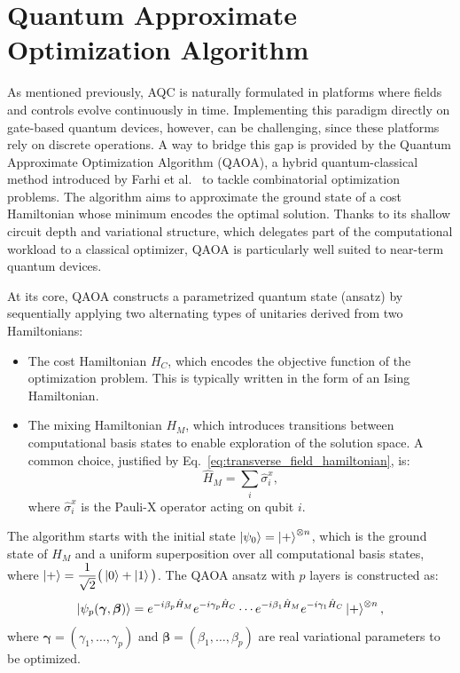 \section{Quantum Approximate Optimization Algorithm}
\label{Section:QAOA}

As mentioned previously, AQC is naturally formulated in platforms where fields and controls evolve continuously in time. Implementing this paradigm directly on gate-based quantum devices, however, can be challenging, since these platforms rely on discrete operations. A way to bridge this gap is provided by the Quantum Approximate Optimization Algorithm (QAOA), a hybrid quantum-classical method introduced by Farhi et al.~\cite{farhi_quantum_2014} to tackle combinatorial optimization problems. The algorithm aims to approximate the ground state of a cost Hamiltonian whose minimum encodes the optimal solution. Thanks to its shallow circuit depth and variational structure, which delegates part of the computational workload to a classical optimizer, QAOA is particularly well suited to near-term quantum devices.

At its core, QAOA constructs a parametrized quantum state (ansatz) by sequentially applying two alternating types of unitaries derived from two Hamiltonians:
\begin{itemize}
    \item The cost Hamiltonian $H_C$, which encodes the objective function of the optimization
    problem. This is typically written in the form of an Ising Hamiltonian.
    \item The mixing Hamiltonian $H_M$, which introduces transitions between computational
    basis states to enable exploration of the solution space. A common choice, justified by Eq.~\eqref{eq:transverse_field_hamiltonian}, is:
    \begin{equation}
        \hat{H}_M = \sum_i \hat{\sigma}_i^x,
        \label{eq:mixing_hamiltonian}
    \end{equation}
    where $\hat{\sigma}_i^x$ is the Pauli-X operator acting on qubit $i$.
\end{itemize}

The algorithm starts with the initial state $\ket{\psi_0} = \ket{+}^{\otimes n}$, which is the ground state of $H_M$ and a uniform superposition over all computational basis states, where $\ket{+} = \dfrac{1}{\sqrt{2}} \big(\ket{0} + \ket{1}\big)$. The QAOA ansatz with $p$ layers is constructed as:
\begin{equation}
    \ket{\psi_p(\bm{\gamma}, \bm{\beta})} = e^{-i \beta_p \hat{H}_M} e^{- i \gamma_p \hat{H}_C} \cdots
    e^{-i \beta_1 \hat{H}_M} e^{- i \gamma_1 \hat{H}_C} \ket{+}^{\otimes n},
    \label{eq:qaoa_state_evolution}
\end{equation}
where $\bm{\gamma} = (\gamma_1, \dots, \gamma_p)$ and $\bm{\beta} = (\beta_1, \dots, \beta_p)$ are real variational parameters to be optimized.

